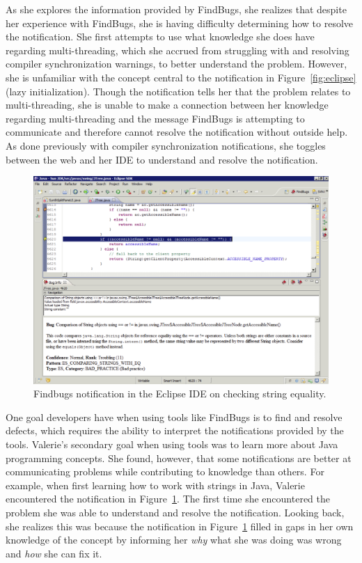 \documentclass{llncs}
\begin{document}
As she explores the information provided by FindBugs, she realizes that despite her experience with FindBugs, she is having difficulty determining how to resolve the notification. She first attempts to use what knowledge she does have regarding multi-threading, which she accrued from struggling with and resolving compiler synchronization warnings, to better understand the problem. 
However, she is unfamiliar with the concept central to the notification in Figure~\ref{fig:eclipse} (lazy initialization). Though the notification tells her that the problem relates to multi-threading, she is unable to make a connection between her knowledge regarding multi-threading and the message FindBugs is attempting to communicate and therefore cannot resolve the notification without outside help. As done previously with compiler synchronization notifications, she toggles between the web and her IDE to understand and resolve the notification.


\begin{figure} 
	\centering
	\includegraphics[width=\textwidth]{figs/eclipse-2.png}
	\caption{Findbugs notification in the Eclipse IDE on checking string equality.}
	\label{fig:eclipse2}
\end{figure}

One goal developers have when using tools like FindBugs is to find and resolve defects, which requires the ability to interpret the notifications provided by the tools. Valerie's secondary goal when using tools was to learn more about Java programming concepts. She found, however, that some notifications are better at communicating problems while contributing to knowledge than others. For example, when first learning how to work with strings in Java, Valerie encountered the notification in Figure~\ref{fig:eclipse2}. The first time she encountered the problem she was able to understand and resolve the notification. Looking back, she realizes this was because the notification in Figure~\ref{fig:eclipse2} filled in gaps in her own knowledge of the concept by informing her \emph{why} what she was doing was wrong and \emph{how} she can fix it.
\end{document}
